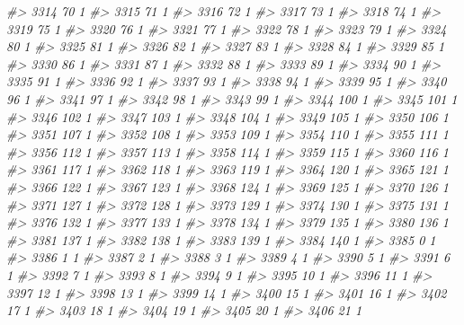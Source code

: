 \documentclass[]{article}
\newenvironment{Shaded}{\begin{snugshade}}{\end{snugshade}}
\newcommand{\CommentTok}[1]{\textcolor[rgb]{0.56,0.35,0.01}{\textit{#1}}}
\begin{document}
\begin{Shaded}
\begin{Highlighting}[]
\CommentTok{#> 3314  70  1}
\CommentTok{#> 3315  71  1}
\CommentTok{#> 3316  72  1}
\CommentTok{#> 3317  73  1}
\CommentTok{#> 3318  74  1}
\CommentTok{#> 3319  75  1}
\CommentTok{#> 3320  76  1}
\CommentTok{#> 3321  77  1}
\CommentTok{#> 3322  78  1}
\CommentTok{#> 3323  79  1}
\CommentTok{#> 3324  80  1}
\CommentTok{#> 3325  81  1}
\CommentTok{#> 3326  82  1}
\CommentTok{#> 3327  83  1}
\CommentTok{#> 3328  84  1}
\CommentTok{#> 3329  85  1}
\CommentTok{#> 3330  86  1}
\CommentTok{#> 3331  87  1}
\CommentTok{#> 3332  88  1}
\CommentTok{#> 3333  89  1}
\CommentTok{#> 3334  90  1}
\CommentTok{#> 3335  91  1}
\CommentTok{#> 3336  92  1}
\CommentTok{#> 3337  93  1}
\CommentTok{#> 3338  94  1}
\CommentTok{#> 3339  95  1}
\CommentTok{#> 3340  96  1}
\CommentTok{#> 3341  97  1}
\CommentTok{#> 3342  98  1}
\CommentTok{#> 3343  99  1}
\CommentTok{#> 3344 100  1}
\CommentTok{#> 3345 101  1}
\CommentTok{#> 3346 102  1}
\CommentTok{#> 3347 103  1}
\CommentTok{#> 3348 104  1}
\CommentTok{#> 3349 105  1}
\CommentTok{#> 3350 106  1}
\CommentTok{#> 3351 107  1}
\CommentTok{#> 3352 108  1}
\CommentTok{#> 3353 109  1}
\CommentTok{#> 3354 110  1}
\CommentTok{#> 3355 111  1}
\CommentTok{#> 3356 112  1}
\CommentTok{#> 3357 113  1}
\CommentTok{#> 3358 114  1}
\CommentTok{#> 3359 115  1}
\CommentTok{#> 3360 116  1}
\CommentTok{#> 3361 117  1}
\CommentTok{#> 3362 118  1}
\CommentTok{#> 3363 119  1}
\CommentTok{#> 3364 120  1}
\CommentTok{#> 3365 121  1}
\CommentTok{#> 3366 122  1}
\CommentTok{#> 3367 123  1}
\CommentTok{#> 3368 124  1}
\CommentTok{#> 3369 125  1}
\CommentTok{#> 3370 126  1}
\CommentTok{#> 3371 127  1}
\CommentTok{#> 3372 128  1}
\CommentTok{#> 3373 129  1}
\CommentTok{#> 3374 130  1}
\CommentTok{#> 3375 131  1}
\CommentTok{#> 3376 132  1}
\CommentTok{#> 3377 133  1}
\CommentTok{#> 3378 134  1}
\CommentTok{#> 3379 135  1}
\CommentTok{#> 3380 136  1}
\CommentTok{#> 3381 137  1}
\CommentTok{#> 3382 138  1}
\CommentTok{#> 3383 139  1}
\CommentTok{#> 3384 140  1}
\CommentTok{#> 3385   0  1}
\CommentTok{#> 3386   1  1}
\CommentTok{#> 3387   2  1}
\CommentTok{#> 3388   3  1}
\CommentTok{#> 3389   4  1}
\CommentTok{#> 3390   5  1}
\CommentTok{#> 3391   6  1}
\CommentTok{#> 3392   7  1}
\CommentTok{#> 3393   8  1}
\CommentTok{#> 3394   9  1}
\CommentTok{#> 3395  10  1}
\CommentTok{#> 3396  11  1}
\CommentTok{#> 3397  12  1}
\CommentTok{#> 3398  13  1}
\CommentTok{#> 3399  14  1}
\CommentTok{#> 3400  15  1}
\CommentTok{#> 3401  16  1}
\CommentTok{#> 3402  17  1}
\CommentTok{#> 3403  18  1}
\CommentTok{#> 3404  19  1}
\CommentTok{#> 3405  20  1}
\CommentTok{#> 3406  21  1}

\end{Highlighting}
\end{Shaded}
\end{document}
